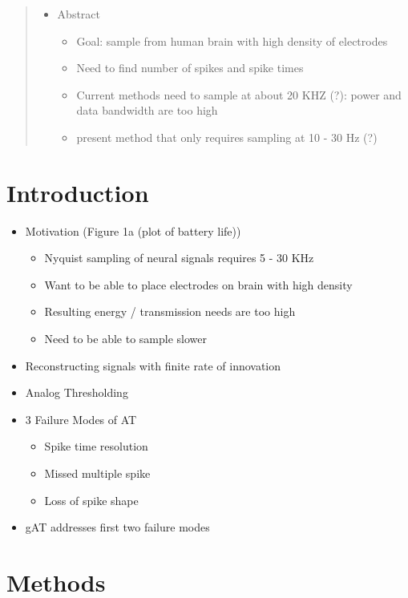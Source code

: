 \documentclass[]{article}
\begin{document}
\begin{abstract}
\begin{itemize}
\item Abstract
\begin{itemize}
\item Goal: sample from human brain with high density of electrodes
\item Need to find number of spikes and spike times
\item Current methods need to sample at about 20 KHZ (?): power and data bandwidth are too high
\item present method that only requires sampling at 10 - 30 Hz (?)
\end{itemize}
\end{itemize}
\end{abstract}

\section{Introduction}
\begin{itemize}
\item Motivation (Figure 1a (plot of battery life))
\begin{itemize}
\item Nyquist sampling of neural signals requires 5 - 30 KHz
\item Want to be able to place electrodes on brain with high density
\item Resulting energy / transmission needs are too high
\item Need to be able to sample slower
\end{itemize}
\item Reconstructing signals with finite rate of innovation
\item Analog Thresholding
\item 3 Failure Modes of AT
\begin{itemize}
\item Spike time resolution
\item Missed multiple spike
\item Loss of spike shape
\end{itemize}
\item gAT addresses first two failure modes
\end{itemize}

\section{Methods}
\end{document}

